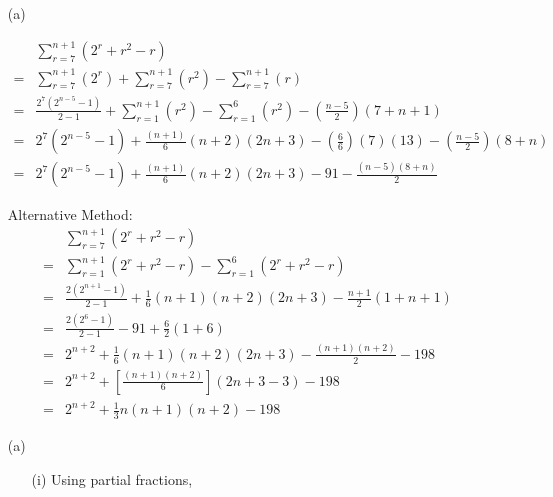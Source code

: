 \item {}
\begin{enumerate}
\item[(a)]  

\begin{align*}
 & \sum\limits _{r=7}^{n+1}\left(2^{r}+r^{2}-r\right)\\
= & \sum\limits _{r=7}^{n+1}\left(2^{r}\right)+\sum\limits _{r=7}^{n+1}\left(r^{2}\right)-\sum\limits _{r=7}^{n+1}\left(r\right)\\
= & \frac{2^{7}\left(2^{n-5}-1\right)}{2-1}+\sum\limits _{r=1}^{n+1}\left(r^{2}\right)-\sum\limits _{r=1}^{6}\left(r^{2}\right)-\left(\frac{n-5}{2}\right)\left(7+n+1\right)\\
= & 2^{7}\left(2^{n-5}-1\right)+\frac{\left(n+1\right)}{6}\left(n+2\right)\left(2n+3\right)-\left(\frac{6}{6}\right)\left(7\right)\left(13\right)-\left(\frac{n-5}{2}\right)\left(8+n\right)\\
= & 2^{7}\left(2^{n-5}-1\right)+\frac{\left(n+1\right)}{6}\left(n+2\right)\left(2n+3\right)-91-\frac{\left(n-5\right)\left(8+n\right)}{2}
\end{align*}

Alternative Method: 
\begin{align*}
 & \sum\limits _{r=7}^{n+1}\left(2^{r}+r^{2}-r\right)\\
= & \sum\limits _{r=1}^{n+1}\left(2^{r}+r^{2}-r\right)-\sum\limits _{r=1}^{6}\left(2^{r}+r^{2}-r\right)\\
= & \frac{2\left(2^{n+1}-1\right)}{2-1}+\frac{1}{6}\left(n+1\right)\left(n+2\right)\left(2n+3\right)-\frac{n+1}{2}\left(1+n+1\right)\\
= & \frac{2\left(2^{6}-1\right)}{2-1}-91+\frac{6}{2}\left(1+6\right)\\
= & 2^{n+2}+\frac{1}{6}\left(n+1\right)\left(n+2\right)\left(2n+3\right)-\frac{\left(n+1\right)\left(n+2\right)}{2}-198\\
= & 2^{n+2}+\left[\frac{\left(n+1\right)\left(n+2\right)}{6}\right]\left(2n+3-3\right)-198\\
= & 2^{n+2}+\frac{1}{3}n\left(n+1\right)\left(n+2\right)-198
\end{align*}

\item[(a)]  
\begin{enumerate}
\item[(i)]  Using partial fractions,


\end{enumerate}
\end{enumerate}
